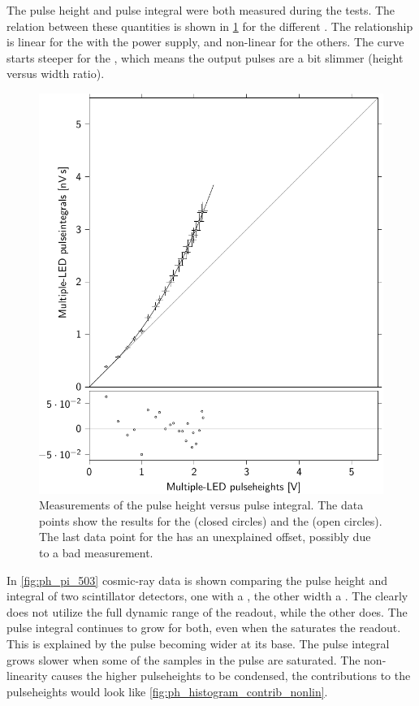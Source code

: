 The pulse height and pulse integral were both measured during the tests. The relation between these quantities is shown in \cref{fig:ph_pi_compared_nikhef_senstech} for the different \pmts. The relationship is linear for the \pmt with the \nikhef power supply, and non-linear for the others. The curve starts steeper for the \senstech \pmt, which means the output pulses are a bit slimmer (height versus width ratio).

\begin{figure}
    \centering
    \includegraphics[width=0.7\linewidth]
                    {plots/station/data_piph_senstech_integral}
    \caption{Measurements of the pulse height versus pulse integral. The data points show the results for the \senstech \pmt (closed circles) and the \nikhef \pmt (open circles). The last data point for the \nikhef \pmt has an unexplained offset, possibly due to a bad measurement.}
    \label{fig:ph_pi_compared_nikhef_senstech}
\end{figure}

In \cref{fig:ph_pi_503} cosmic-ray data is shown comparing the pulse height and integral of two scintillator detectors, one with a \nikhef \pmt, the other width a \senstech \pmt. The \senstech \pmt clearly does not utilize the full dynamic range of the readout, while the other does. The pulse integral continues to grow for both, even when the \nikhef \pmt saturates the readout. This is explained by the pulse becoming wider at its base. The pulse integral grows slower when some of the samples in the pulse are saturated. The non-linearity causes the higher pulseheights to be condensed, the contributions to the pulseheights would look like \cref{fig:ph_histogram_contrib_nonlin}.

